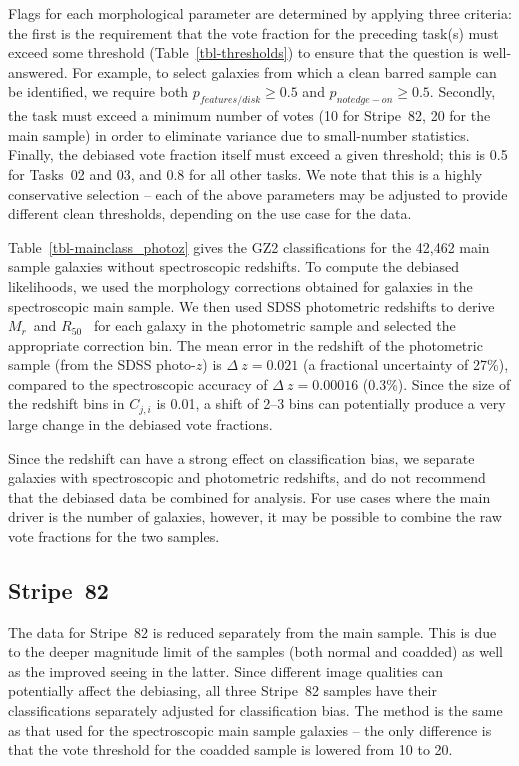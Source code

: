 \documentclass[useAMS,usenatbib]{mn2e}
\newcommand{\mr}{$M_r$}
\newcommand{\rfifty}{$R_{50}$}
\begin{document}
Flags for each morphological parameter are determined by applying three criteria: the first is the requirement that the vote fraction for the preceding task(s) must exceed some threshold (Table~\ref{tbl-thresholds}) to ensure that the question is well-answered. For example, to select galaxies from which a clean barred sample can be identified, we require both $p_{features/disk}\geq0.5$ and $p_{not edge-on}\geq0.5$. Secondly, the task must exceed a minimum number of votes (10 for Stripe~82, 20 for the main sample) in order to eliminate variance due to small-number statistics. Finally, the debiased vote fraction itself must exceed a given threshold; this is 0.5 for Tasks~02 and 03, and 0.8 for all other tasks. We note that this is a highly conservative selection -- each of the above parameters may be adjusted to provide different clean thresholds, depending on the use case for the data.%

Table~\ref{tbl-mainclass_photoz} gives the GZ2 classifications for the 42,462 main sample galaxies without spectroscopic redshifts. To compute the debiased likelihoods, we used the morphology corrections obtained for galaxies in the spectroscopic main sample. We then used SDSS photometric redshifts \citep{csa03} to derive \mr~and \rfifty~ for each galaxy in the photometric sample and selected the appropriate correction bin. The mean error in the redshift of the photometric sample (from the SDSS photo-$z$) is $\Delta~z=0.021$ (a fractional uncertainty of 27\%), compared to the spectroscopic accuracy of $\Delta~z=0.00016$ (0.3\%). Since the size of the redshift bins in $C_{j,i}$ is 0.01, a shift of 2--3 bins can potentially produce a very large change in the debiased vote fractions. 

Since the redshift can have a strong effect on classification bias, we separate galaxies with spectroscopic and photometric redshifts, and do not recommend that the debiased data be combined for analysis. For use cases where the main driver is the number of galaxies, however, it may be possible to combine the raw vote fractions for the two samples.

\subsection{Stripe~82}\label{ssec-s82}

The data for Stripe~82 is reduced separately from the main sample. This is due to the deeper magnitude limit of the samples (both normal and coadded) as well as the improved seeing in the latter. Since different image qualities can potentially affect the debiasing, all three Stripe~82 samples have their classifications separately adjusted for classification bias. The method is the same as that used for the spectroscopic main sample galaxies -- the only difference is that the vote threshold for the coadded sample is lowered from 10 to 20. 
\end{document}
